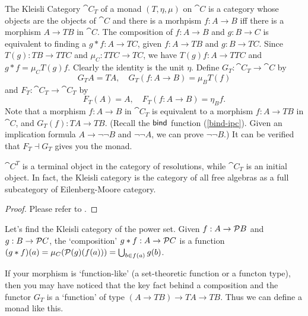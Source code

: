 \begin{definition}
    \label{kleisli-category}
    The Kleisli Category $\cat{C}_T$ of a monad $(T,\eta,\mu)$ on 
    $\cat{C}$ is a category whose objects are the objects of $\cat{C}$ 
    and there is a morhpism $f: A\to B$ iff there is a morphism $A\to TB$
    in $\cat{C}$. The composition of $f:A\to B$ and $g:B\to C$ is
    equivalent to finding a $g\ast f:A\to TC$, given $f:A\to TB$ and 
    $g:B\to TC$. Since $T(g): TB\to TTC$ and $\mu_C:TTC\to TC$, we have
    $T(g)f: A\to TTC$ and $g\ast f=\mu_CT(g)f$. Clearly the identity
    is the unit $\eta$. Define $G_T:\cat{C}_T\to \cat{C}$ by
    $$
        G_TA = TA,\quad G_T(f:A\to B)=\mu_BT(f)
    $$
    and $F_T: \cat{C}_T\to\cat{C}_T$ by
    $$
        F_T(A)=A,\quad F_T(f:A\to B)=\eta_Bf.
    $$
    Note that a morphism $f: A\to B$ in $\cat{C}_T$ is equivalent to a
    morphism $f:A\to TB$ in $\cat{C}$, and $G_T(f): TA\to TB$. (Recall
    the $\text{\sf bind}$ function (\cref{bind-ipc}). Given an implication 
    formula $A\to \neg\neg B$ and $\neg\neg A$, we can prove $\neg\neg 
    B$.) It can be verified that $F_T\dashv G_T$ gives you the monad.
\end{definition}

\begin{theorem}
    $\cat{C}^T$ is a terminal object in the category of resolutions,
    while $\cat{C}_T$ is an initial object. In fact, the Kleisli category
    is the category of all free algebras as a full subcategory of 
    Eilenberg-Moore category.
\end{theorem}
\begin{proof}
    Please refer to \cite{Introduction-to-higher-order-categorical-logic}.
\end{proof}

Let's find the Kleisli category of the power set. Given $f: A \to 
\mathcal{P}{B}$ and $g: B\to\mathcal{P}{C}$, the `composition' $g\ast 
f:A\to\mathcal{P}{C}$ is a function $(g\ast f)(a)=\mu_C(\mathcal{P}(g)(f(a)))
=\bigcup_{b\in f(a)}g(b)$.

If your morphism is `function-like' (a set-theoretic function or a
functon type), then you may have noticed that the key fact behind a
composition and the functor $G_T$ is a `function' of type
$(A\to TB)\to TA\to TB$. Thus we can define a monad like this. 

